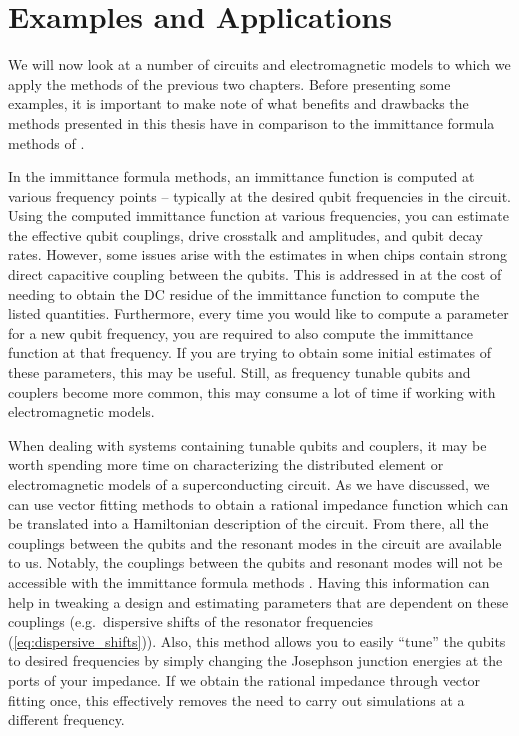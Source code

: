 \chapter{Examples and Applications}\label{chapter:examples}

We will now look at a number of circuits and electromagnetic models to which we apply the methods of the previous two chapters. Before presenting some examples, it is important to make note of what benefits and drawbacks the methods presented in this thesis have in comparison to the immittance formula methods of \cite{solgun_sirf,sherbrooke_sirf}.

In the immittance formula methods, an immittance function is computed at various frequency points -- typically at the desired qubit frequencies in the circuit. Using the computed immittance function at various frequencies, you can estimate the effective qubit couplings, drive crosstalk and amplitudes, and qubit decay rates. However, some issues arise with the estimates in \cite{solgun_sirf} when chips contain strong direct capacitive coupling between the qubits. This is addressed in \cite{sherbrooke_sirf} at the cost of needing to obtain the DC residue of the immittance function to compute the listed quantities. Furthermore, every time you would like to compute a parameter for a new qubit frequency, you are required to also compute the immittance function at that frequency. If you are trying to obtain some initial estimates of these parameters, this may be useful. Still, as frequency tunable qubits and couplers become more common, this may consume a lot of time if working with electromagnetic models.

When dealing with systems containing tunable qubits and couplers, it may be worth spending more time on characterizing the distributed element or electromagnetic models of a superconducting circuit. As we have discussed, we can use vector fitting methods to obtain a rational impedance function which can be translated into a Hamiltonian description of the circuit. From there, all the couplings between the qubits and the resonant modes in the circuit are available to us. Notably, the couplings between the qubits and resonant modes will not be accessible with the immittance formula methods \cite{solgun_sirf, sherbrooke_sirf}. Having this information can help in tweaking a design and estimating parameters that are dependent on these couplings (e.g.\ dispersive shifts of the resonator frequencies (\ref{eq:dispersive_shifts})). Also, this method allows you to easily ``tune'' the qubits to desired frequencies by simply changing the Josephson junction energies at the ports of your impedance. If we obtain the rational impedance through vector fitting once, this effectively removes the need to carry out simulations at a different frequency.

